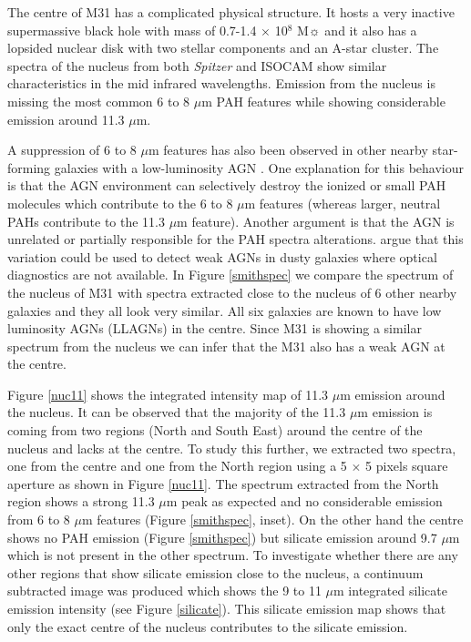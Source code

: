 \documentclass[useAMS,usenatbib,a4paper]{mn2e}
\begin{document}
	
The centre of M31 has a complicated physical structure. It hosts a very inactive supermassive black hole with  mass of 0.7-1.4 $\times$ 10$^8$ M$\sun$ \citep{Bacon2001} and it also has a lopsided nuclear disk \citep{Lauer1993} with two stellar components and an A-star cluster. The spectra of the nucleus from both {\em Spitzer} and ISOCAM show similar characteristics in the mid infrared wavelengths. Emission from the nucleus is missing the most common 6 to 8 $\mu$m PAH features while showing considerable emission around 11.3 $\mu$m. 

A suppression of 6 to 8 $\mu$m features has also been observed in other nearby star-forming galaxies with a low-luminosity AGN \citep{Smith:2007lr}. One explanation for this behaviour is that the AGN environment can selectively destroy the ionized or small PAH molecules which contribute to the 6 to 8 $\mu$m features (whereas larger, neutral PAHs contribute to the 11.3 $\mu$m feature). Another argument is that the AGN is unrelated or partially responsible for the PAH spectra alterations. \citet{Smith:2007lr} argue that this variation could be used to detect weak AGNs in dusty galaxies where optical diagnostics are not available. In Figure \ref{smithspec} we compare the spectrum of the nucleus of M31 with spectra extracted close to the nucleus of 6 other nearby galaxies and they all look very similar. All six galaxies are known to have low luminosity AGNs (LLAGNs) in the centre. Since M31 is showing a similar spectrum from the nucleus we can infer that the M31 also has a weak AGN at the centre.

Figure \ref{nuc11} shows the integrated intensity map of 11.3 $\mu$m emission around the nucleus. It can be observed that the majority of the 11.3 $\mu$m emission is coming from two regions (North and South East) around the centre of the nucleus and lacks at the centre. To study this further, we extracted two spectra, one from the centre and one from the North region using a 5 $\times$ 5 pixels square aperture as shown in Figure \ref{nuc11}. The spectrum extracted from the North region shows a strong 11.3 $\mu$m peak as expected and no considerable emission from 6 to 8 $\mu$m features (Figure \ref{smithspec}, inset). On the other hand the centre shows no PAH emission (Figure \ref{smithspec}) but silicate emission around 9.7 $\mu$m which is not present in the other spectrum. To investigate whether there are any other regions that show silicate emission close to the nucleus, a continuum subtracted image was produced which shows the 9 to 11 $\mu$m integrated silicate emission intensity (see Figure \ref{silicate}). This silicate emission map shows that only the exact centre of the nucleus contributes to the silicate emission. 
\end{document}
